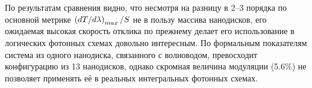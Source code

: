 По результатам сравнения видно, что несмотря на разницу в 2--3 порядка по основной метрике $\left( dT/d\lambda \right)_{max}/S$ не в пользу массива нанодисков, его ожидаемая высокая скорость отклика по прежнему делает его использование в логических фотонных схемах довольно интересным. По формальным показателям система из одного нанодиска, связанного с волноводом, превосходит конфигурацию из 13 нанодисков, однако скромная величина модуляции (5.6\%) не позволяет применять её в реальных интегральных фотонных схемах.